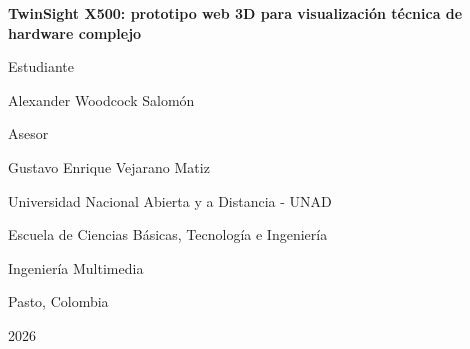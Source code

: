 ﻿\documentclass[12pt,letterpaper]{article}
\begin{document}
\begin{titlepage}
    \thispagestyle{plain}
    \centering
    {\normalfont\bfseries TwinSight X500: prototipo web 3D para visualización técnica de hardware complejo\par}

    \vspace{2\baselineskip}
    \vspace{2\baselineskip}

    {\normalfont Estudiante\par}
    {\normalfont Alexander Woodcock Salomón\par}

    \vspace{2\baselineskip}
    \vspace{2\baselineskip}

    {\normalfont Asesor\par}
    {\normalfont Gustavo Enrique Vejarano Matiz\par}

    \vfill

    {\normalfont Universidad Nacional Abierta y a Distancia - UNAD\par
     Escuela de Ciencias Básicas, Tecnología e Ingeniería\par
     Ingeniería Multimedia\par}

    \vspace{1\baselineskip}
    {Pasto, Colombia\par}
    {2026\par}
\end{titlepage}
\setcounter{page}{2}

\pagestyle{fancy}
\end{document}
